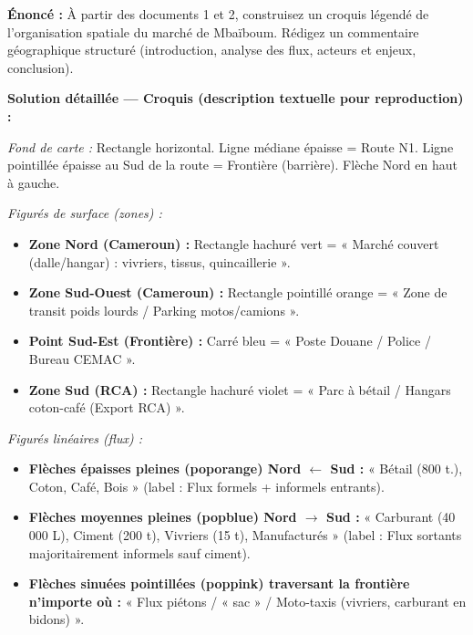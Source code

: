 \documentclass[11pt]{article}
\begin{document}
\begin{exoresolu}
\textbf{Énoncé :} À partir des documents 1 et 2, construisez un croquis légendé de l'organisation spatiale du marché de Mbaïboum. Rédigez un commentaire géographique structuré (introduction, analyse des flux, acteurs et enjeux, conclusion).

\tcblower
\textbf{Solution détaillée — Croquis (description textuelle pour reproduction) :}

\textit{Fond de carte :} Rectangle horizontal. Ligne médiane épaisse = Route N1. Ligne pointillée épaisse au Sud de la route = Frontière (barrière). Flèche Nord en haut à gauche.

\textit{Figurés de surface (zones) :}
\begin{itemize}
    \item \textcolor{popgreen}{\textbf{Zone Nord (Cameroun) :}} Rectangle hachuré vert = « Marché couvert (dalle/hangar) : vivriers, tissus, quincaillerie ».
    \item \textcolor{poporange}{\textbf{Zone Sud-Ouest (Cameroun) :}} Rectangle pointillé orange = « Zone de transit poids lourds / Parking motos/camions ».
    \item \textcolor{popblue}{\textbf{Point Sud-Est (Frontière) :}} Carré bleu = « Poste Douane / Police / Bureau CEMAC ».
    \item \textcolor{poppurple}{\textbf{Zone Sud (RCA) :}} Rectangle hachuré violet = « Parc à bétail / Hangars coton-café (Export RCA) ».
\end{itemize}

\textit{Figurés linéaires (flux) :}
\begin{itemize}
    \item \textbf{Flèches épaisses pleines (poporange) Nord $\leftarrow$ Sud :} « Bétail (800 t.), Coton, Café, Bois » (label : Flux formels + informels entrants).
    \item \textbf{Flèches moyennes pleines (popblue) Nord $\rightarrow$ Sud :} « Carburant (40\,000 L), Ciment (200 t), Vivriers (15 t), Manufacturés » (label : Flux sortants majoritairement informels sauf ciment).
    \item \textbf{Flèches sinuées pointillées (poppink) traversant la frontière n'importe où :} « Flux piétons / « sac » / Moto-taxis (vivriers, carburant en bidons) ».
\end{itemize}


\end{exoresolu}
\end{document}
